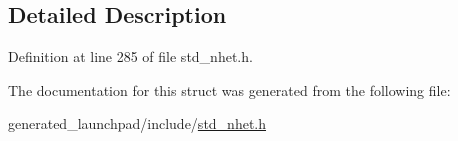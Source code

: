 \subsection{Detailed Description}


Definition at line 285 of file std\+\_\+nhet.\+h.



The documentation for this struct was generated from the following file\+:\begin{DoxyCompactItemize}
\item 
generated\+\_\+launchpad/include/\mbox{\hyperlink{std__nhet_8h}{std\+\_\+nhet.\+h}}\end{DoxyCompactItemize}
